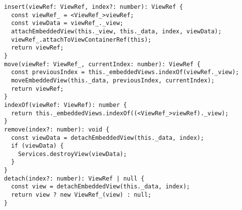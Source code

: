 \begin{verbatim}
  insert(viewRef: ViewRef, index?: number): ViewRef {
    const viewRef_ = <ViewRef_>viewRef;
    const viewData = viewRef_._view;
    attachEmbeddedView(this._view, this._data, index, viewData);
    viewRef_.attachToViewContainerRef(this);
    return viewRef;
  }
  move(viewRef: ViewRef_, currentIndex: number): ViewRef {
    const previousIndex = this._embeddedViews.indexOf(viewRef._view);
    moveEmbeddedView(this._data, previousIndex, currentIndex);
    return viewRef;
  }
  indexOf(viewRef: ViewRef): number {
    return this._embeddedViews.indexOf((<ViewRef_>viewRef)._view);
  }
  remove(index?: number): void {
    const viewData = detachEmbeddedView(this._data, index);
    if (viewData) {
      Services.destroyView(viewData);
    }
  }
  detach(index?: number): ViewRef | null {
    const view = detachEmbeddedView(this._data, index);
    return view ? new ViewRef_(view) : null;
  }
\end{verbatim}
